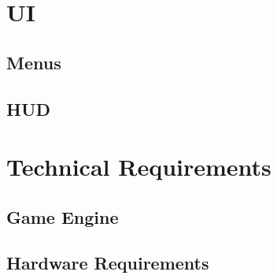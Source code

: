 \documentclass[pdftex,12pt,a4paper,ngerman,dvipsnames]{scrreport}
\begin{document}
\chapter{UI}
\section{Menus}
\section{HUD}
\chapter{Technical Requirements}
\section{Game Engine}
\section{Hardware Requirements}
\end{document}
